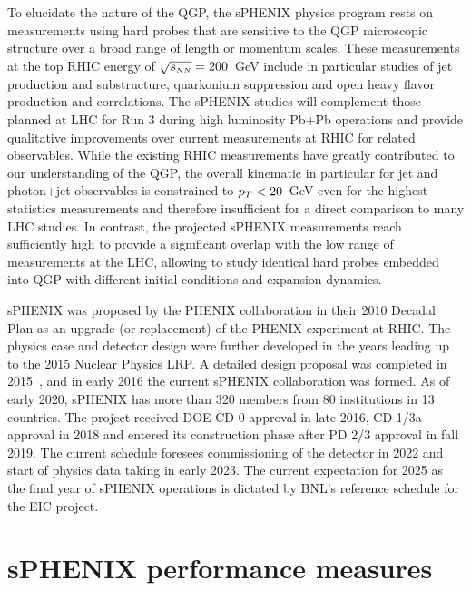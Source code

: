 To elucidate the nature of the QGP, the sPHENIX physics program rests on measurements using hard probes that are sensitive to the QGP microscopic structure over a broad range of length or momentum scales. These measurements at the top RHIC energy of $\mbox{$\sqrt{s_{\scriptscriptstyle NN}}$} = 200$~GeV include in particular studies of jet production and substructure, quarkonium suppression and open heavy flavor production and correlations. The sPHENIX studies will complement those planned at LHC for Run 3 during high luminosity Pb+Pb operations and provide qualitative improvements over current measurements at RHIC for related observables. While the existing RHIC measurements have greatly contributed to our understanding of the QGP, the overall kinematic in particular for jet and photon+jet observables is constrained to $\mbox{${p_T}$} < 20$~GeV even for the highest statistics measurements and therefore insufficient for a direct comparison to many LHC studies. In contrast, the projected sPHENIX measurements reach sufficiently high \pt to provide a significant overlap with the low range of measurements at the LHC, allowing to study identical hard probes embedded into QGP with different initial conditions and expansion dynamics.

sPHENIX was proposed by the PHENIX collaboration in their 2010 Decadal Plan as an upgrade (or replacement) of the PHENIX experiment at RHIC. The physics case and detector design were further developed in the years leading up to the 2015 Nuclear Physics LRP. A detailed design proposal was completed in 2015~\cite{sPHENIX:2015irh}, and in early 2016 the current sPHENIX collaboration was formed. As of early 2020, sPHENIX has more than 320 members from 80 institutions in 13 countries. The project received DOE CD-0 approval in late 2016, CD-1/3a approval in 2018 and entered its construction phase after PD 2/3 approval in fall 2019. The current schedule foresees commissioning of the detector in 2022 and start of physics data taking in early 2023. The current expectation for 2025 as the final year of sPHENIX operations is dictated by BNL's reference schedule for the EIC project.

\section{sPHENIX performance measures}

